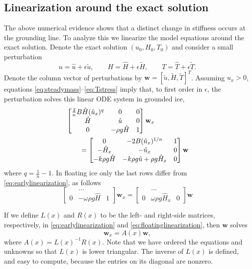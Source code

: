 \documentclass[review,letterpaper]{igs}
\newcommand{\bw}{\mathbf{w}}
\newcommand{\hu}{\hat u}
\newcommand{\hH}{\hat H}
\newcommand{\hT}{\hat T}
\newcommand{\tu}{\tilde u}
\newcommand{\tH}{\tilde H}
\newcommand{\tT}{\tilde T}
\newcommand{\eps}{\epsilon}
\begin{document}
\subsection*{Linearization around the exact solution}  The above numerical evidence shows that a distinct change in stiffness occurs at the grounding line.  To analyze this we linearize the model equations around the exact solution.  Denote the exact solution $(u_0,H_0,T_0)$ and consider a small perturbation
\begin{equation}
u = \hu + \eps \tu, \qquad H = \hH + \eps \tH, \qquad T = \hT + \eps \tT. \label{eq:perturbation}
\end{equation}
Denote the column vector of perturbations by $\bw = [\tu, \tH, \tT]^T$.  Assuming $u_x > 0$, equations \eqref{eq:steadymass}--\eqref{eq:Tstress} imply that, to first order in $\eps$, the perturbation solves this linear ODE system in grounded ice,
\begin{align}
&\begin{bmatrix}
\frac{2}{n} B \hH (\hu_x)^q & 0 & 0 \\
\hH & \hu & 0 \\
0 & -\rho g \hH & 1
\end{bmatrix}
\bw_x \notag \\
&\qquad =
\begin{bmatrix}
0 & - 2 B (\hu_x)^{1/n} & 1 \\
- \hH_x & - \hu_x & 0 \\
-k \rho g \hH & - k \rho g \hu + \rho g \hH_x & 0
\end{bmatrix}
\bw  \label{eq:earlylinearization}
\end{align}
where $q = \frac{1}{n} - 1$.  In floating ice only the last rows differ from \eqref{eq:earlylinearization}, as follows
\begin{equation}
\begin{bmatrix}
 & \dots & \\
0 & - \omega \rho g \hH & 1
\end{bmatrix}
\bw_x
=
\begin{bmatrix}
 & \dots & \\
0 & \omega \rho g \hH_x & 0
\end{bmatrix}
\bw
\label{eq:floatinglinearization}
\end{equation}

If we define $L(x)$ and $R(x)$ to be the left- and right-side matrices, respectively, in \eqref{eq:earlylinearization} and \eqref{eq:floatinglinearization}, then $\bw$ solves
\begin{equation}
\bw_x = A(x) \bw, \label{eq:linearization}
\end{equation}
where $A(x) = L(x)^{-1} R(x)$.  Note that we have ordered the equations and unknowns so that $L(x)$ is lower triangular.  The inverse of $L(x)$ is defined, and easy to compute, because the entries on its diagonal are nonzero.
\end{document}
